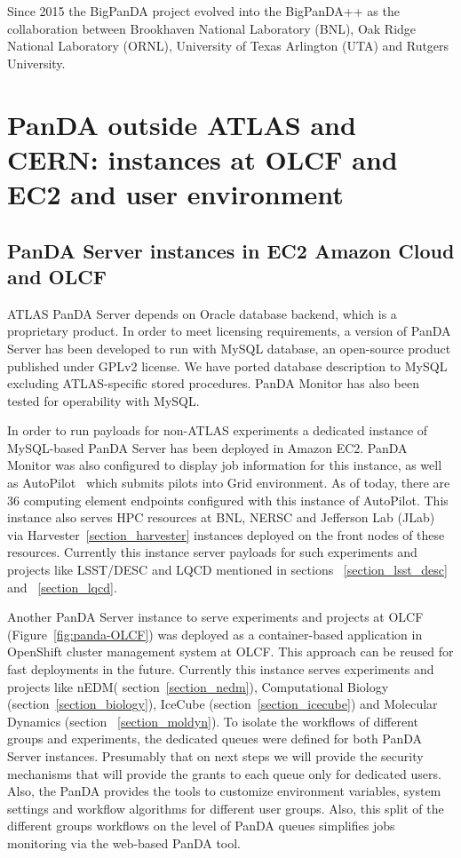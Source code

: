 \documentclass{webofc}
\begin{document}
Since 2015 the BigPanDA project evolved into the  BigPanDA++ as the collaboration between Brookhaven National Laboratory (BNL), Oak Ridge National Laboratory (ORNL),  University of Texas Arlington (UTA) and Rutgers University.


\section{PanDA outside ATLAS and CERN: instances at OLCF and EC2 and user environment}

\subsection{PanDA Server instances in EC2 Amazon Cloud and OLCF}


ATLAS PanDA Server depends on Oracle database backend, which is a proprietary product. In order to meet licensing requirements, a version of PanDA Server has been developed to run with MySQL database, an open-source product published under GPLv2 license.  
We have ported database description to MySQL excluding ATLAS-specific stored procedures. PanDA Monitor has also been tested for operability with MySQL.

In order to run payloads for non-ATLAS experiments a dedicated instance of MySQL-based PanDA Server has been deployed in Amazon EC2.  
PanDA Monitor was also configured to display job information for this instance, as well as AutoPilot~\cite{PanDAPilotSubmission} which submits pilots into Grid environment. 
As of today, there are 36 computing element endpoints configured with this instance of AutoPilot. 
This instance also serves HPC resources at BNL, NERSC and Jefferson Lab (JLab) via Harvester~\ref{section_harvester} instances deployed on the front nodes of these resources. 
Currently this instance server payloads for such experiments and projects like LSST/DESC and LQCD mentioned in sections ~\ref{section_lsst_desc} and ~\ref{section_lqcd}.

Another  PanDA Server instance to serve experiments and projects at OLCF (Figure~\ref{fig:panda-OLCF}) was deployed as a container-based application in OpenShift cluster management system at OLCF. This approach can be reused for fast deployments in the future. Currently this instance serves experiments and projects like nEDM( section~\ref{section_nedm}), Computational Biology (section~\ref{section_biology}), IceCube (section~\ref{section_icecube}) and Molecular Dynamics (section ~\ref{section_moldyn}).
To isolate the workflows of different groups and experiments, the dedicated queues were defined for both PanDA Server instances. 
Presumably that on next steps we will provide the security mechanisms that will provide the grants to each queue only for dedicated users. 
Also, the PanDA provides the tools to customize environment variables, system settings and workflow algorithms for different user groups. 
Also, this split of the different groups workflows on the level of PanDA queues simplifies jobs monitoring via the web-based PanDA tool. 
\end{document}
